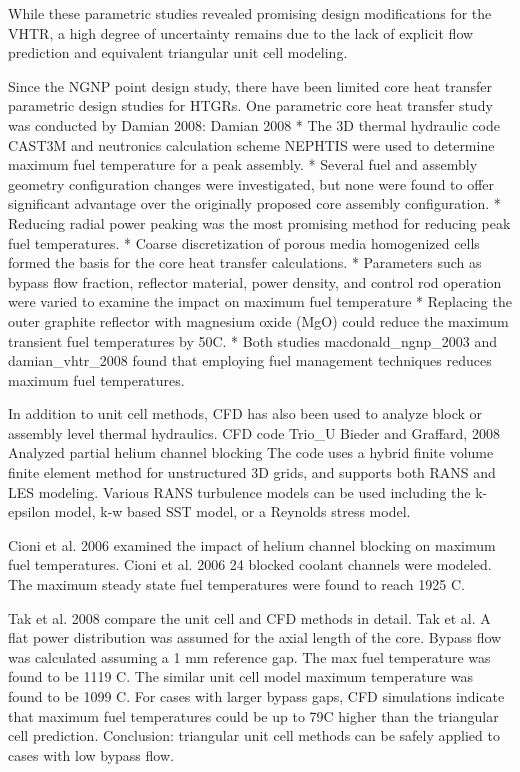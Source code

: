 While these parametric studies revealed promising design modifications for the VHTR, a high degree of uncertainty remains due to the lack of explicit flow prediction and equivalent triangular unit cell modeling.

Since the NGNP point design study, there have been limited core heat transfer parametric design studies for HTGRs.
One parametric core heat transfer study was conducted by Damian 2008:
Damian 2008 %
* The 3D thermal hydraulic code CAST3M and neutronics calculation scheme NEPHTIS were used to determine maximum fuel temperature for a peak assembly.
* Several fuel and assembly geometry configuration changes were investigated, but none were found to offer significant advantage over the originally proposed core assembly configuration.
* Reducing radial power peaking was the most promising method for reducing peak fuel temperatures.
* Coarse discretization of porous media homogenized cells formed the basis for the core heat transfer calculations.
* Parameters such as bypass flow fraction, reflector material, power density, and control rod operation were varied to examine the impact on maximum fuel temperature
* Replacing the outer graphite reflector with magnesium oxide (MgO) could reduce the maximum transient fuel temperatures by 50C.
* Both studies macdonald_ngnp_2003 and damian_vhtr_2008 found that employing fuel management techniques reduces maximum fuel temperatures.

In addition to unit cell methods, CFD has also been used to analyze block or assembly level thermal hydraulics.
CFD code Trio_U Bieder and Graffard, 2008 %
Analyzed partial helium channel blocking
The code uses a hybrid finite volume finite element method for unstructured 3D grids, and supports both RANS and LES modeling.
Various RANS turbulence models can be used including the k-epsilon model, k-w based SST model, or a Reynolds stress model.

Cioni et al. 2006 examined the impact of helium channel blocking on maximum fuel temperatures.
Cioni et al. 2006 %
24 blocked coolant channels were modeled.
The maximum steady state fuel temperatures were found to reach 1925 C.

Tak et al. 2008 compare the unit cell and CFD methods in detail.
Tak et al. %
A flat power distribution was assumed for the axial length of the core.
Bypass flow was calculated assuming a 1 mm reference gap.
The max fuel temperature was found to be 1119 C.
The similar unit cell model maximum temperature was found to be 1099 C.
For cases with larger bypass gaps, CFD simulations indicate that maximum fuel temperatures could be up to 79C higher than the triangular cell prediction.
Conclusion: triangular unit cell methods can be safely applied to cases with low bypass flow.

